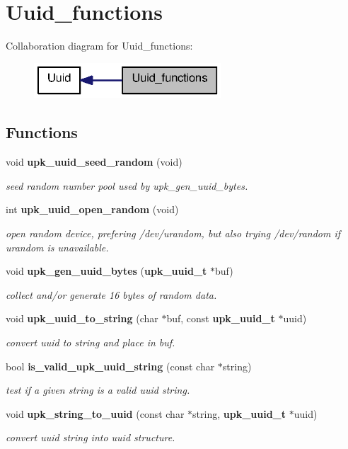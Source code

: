 \section{Uuid\_\-functions}
\label{group__uuid__functions}
Collaboration diagram for Uuid\_\-functions:\nopagebreak
\begin{figure}[H]
\begin{center}
\leavevmode
\includegraphics[width=198pt]{group__uuid__functions}
\end{center}
\end{figure}
\subsection*{Functions}
\begin{DoxyCompactItemize}
\item 
void {\bf upk\_\-uuid\_\-seed\_\-random} (void)
\begin{DoxyCompactList}\small\item\em seed random number pool used by upk\_\-gen\_\-uuid\_\-bytes. \end{DoxyCompactList}\item 
int {\bf upk\_\-uuid\_\-open\_\-random} (void)
\begin{DoxyCompactList}\small\item\em open random device, prefering /dev/urandom, but also trying /dev/random if urandom is unavailable. \end{DoxyCompactList}\item 
void {\bf upk\_\-gen\_\-uuid\_\-bytes} ({\bf upk\_\-uuid\_\-t} $\ast$buf)
\begin{DoxyCompactList}\small\item\em collect and/or generate 16 bytes of random data. \end{DoxyCompactList}\item 
void {\bf upk\_\-uuid\_\-to\_\-string} (char $\ast$buf, const {\bf upk\_\-uuid\_\-t} $\ast$uuid)
\begin{DoxyCompactList}\small\item\em convert uuid to string and place in buf. \end{DoxyCompactList}\item 
bool {\bf is\_\-valid\_\-upk\_\-uuid\_\-string} (const char $\ast$string)
\begin{DoxyCompactList}\small\item\em test if a given string is a valid uuid string. \end{DoxyCompactList}\item 
void {\bf upk\_\-string\_\-to\_\-uuid} (const char $\ast$string, {\bf upk\_\-uuid\_\-t} $\ast$uuid)
\begin{DoxyCompactList}\small\item\em convert uuid string into uuid structure. \end{DoxyCompactList}\end{DoxyCompactItemize}


